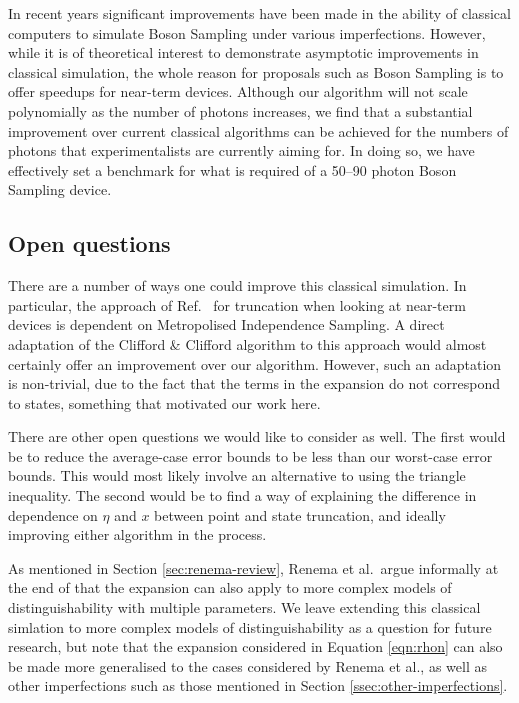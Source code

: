 In recent years significant improvements have been made in the ability of classical computers to simulate Boson Sampling under various imperfections. 
However, while it is of theoretical interest to demonstrate asymptotic improvements in classical simulation, the whole reason for proposals such as Boson Sampling is to offer speedups for near-term devices. 
Although our algorithm will not scale polynomially as the number of photons increases, we find that a substantial improvement over current classical algorithms can be achieved for the numbers of photons that experimentalists are currently aiming for. 
In doing so, we have effectively set a benchmark for what is required of a 50--90 photon Boson Sampling device.

\subsection{Open questions}

There are a number of ways one could improve this classical simulation. 
In particular, the approach of Ref.~\cite{renema2018} for truncation when looking at near-term devices is dependent on Metropolised Independence Sampling. 
A direct adaptation of the Clifford \& Clifford algorithm to this approach would almost certainly offer an improvement over our algorithm. 
However, such an adaptation is non-trivial, due to the fact that the terms in the expansion do not correspond to states, something that motivated our work here.

There are other open questions we would like to consider as well. The first would be to reduce the average-case error bounds to be less than our worst-case error bounds. This would most likely involve an alternative to using the triangle inequality. The second would be to find a way of explaining the difference in dependence on $\eta$ and $x$ between point and state truncation, and ideally improving either algorithm in the process.

As mentioned in Section \ref{sec:renema-review}, Renema et al.\ argue informally at the end of \cite{renema2018} that the expansion can also apply to more complex models of distinguishability with multiple parameters. We leave extending this classical simlation to more complex models of distinguishability as a question for future research, but note that the expansion considered in Equation \ref{eqn:rhon} can also be made more generalised to the cases considered by Renema et al., as well as other imperfections such as those mentioned in Section \ref{ssec:other-imperfections}.

